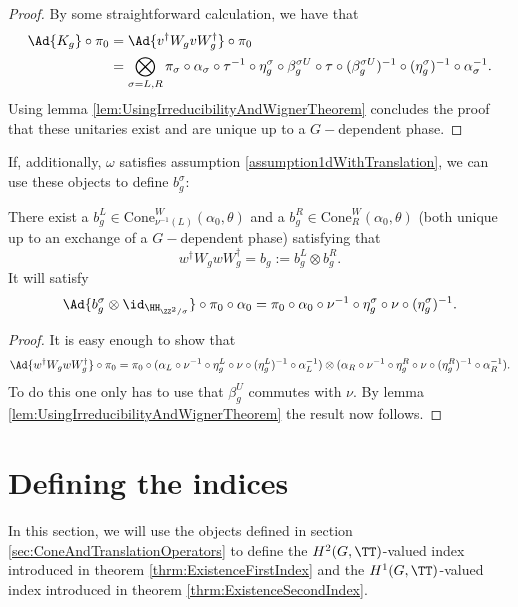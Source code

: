\begin{proof}
	By some straightforward calculation, we have that
	\begin{align}
		\Ad{K_g}\circ\pi_0&=\Ad{v^\dagger W_g v W_g^\dagger}\circ\pi_0\\
		\nonumber
		&=\bigotimes_{\sigma=L,R}\pi_\sigma\circ\alpha_\sigma\circ\tau^{-1}\circ \eta_g^\sigma\circ\beta_g^{\sigma U}\circ\tau\circ(\beta_g^{\sigma U})^{-1}\circ(\eta_g^{\sigma})^{-1}\circ\alpha_\sigma^{-1}.
	\end{align}
	Using lemma \ref{lem:UsingIrreducibilityAndWignerTheorem} concludes the proof that these unitaries exist and are unique up to a $G-$dependent phase.
\end{proof}
If, additionally, $\omega$ satisfies assumption \ref{assumption1dWithTranslation}, we can use these objects to define $b^\sigma_g$:
\begin{lemma}
	There exist a $b_g^L\in\textrm{Cone}_{\nu^{-1}(L)}^W(\alpha_0,\theta)$ and a $b_g^R\in\textrm{Cone}_{R}^W(\alpha_0,\theta)$ (both unique up to an exchange of a $G-$dependent phase) satisfying that
	\begin{equation}
		w^\dagger W_g w W_g^\dagger=b_g:=b_g^L\otimes b_g^R.
	\end{equation}
	It will satisfy
	\begin{equation}\label{eq:automorphismBelongingTo_b}
		\Ad{b_g^\sigma\otimes\id_{\HH_{\ZZ^2/\sigma}}}\circ\pi_0\circ\alpha_0=\pi_0\circ\alpha_0\circ\nu^{-1}\circ\eta_g^\sigma\circ\nu\circ(\eta_g^\sigma)^{-1}.
	\end{equation}
\end{lemma}
\begin{proof}
	It is easy enough to show that
	\begin{equation}
		\Ad{w^\dagger W_g w W_g^\dagger}\circ\pi_0=\pi_0\circ (\alpha_L\circ\nu^{-1}\circ\eta_g^L\circ\nu\circ(\eta_g^L)^{-1}\circ\alpha_L^{-1})\otimes(\alpha_R\circ\nu^{-1}\circ\eta_g^R\circ\nu\circ(\eta_g^R)^{-1}\circ\alpha_R^{-1}).
	\end{equation}
	To do this one only has to use that $\beta_g^U$ commutes with $\nu$. By lemma \ref{lem:UsingIrreducibilityAndWignerTheorem} the result now follows.
\end{proof}
\section{Defining the indices}
In this section, we will use the objects defined in section \ref{sec:ConeAndTranslationOperators} to define the $H^2(G,\TT)$-valued index introduced in theorem \ref{thrm:ExistenceFirstIndex} and the $H^1(G,\TT)$-valued index introduced in theorem \ref{thrm:ExistenceSecondIndex}.

